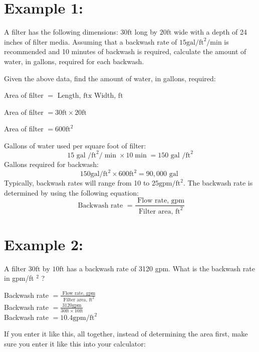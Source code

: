 \documentclass[10pt]{article}
\begin{document}
\section{Example 1:}
A filter has the following dimensions: $30 \mathrm{ft}$ long by $20 \mathrm{ft}$ wide with a depth of 24 inches of filter media. Assuming that a backwash rate of $15 \mathrm{gal} / \mathrm{ft}^{2} / \mathrm{min}$ is recommended and 10 minutes of backwash is required, calculate the amount of water, in gallons, required for each backwash.

Given the above data, find the amount of water, in gallons, required:

Area of filter $=$ Length, $\mathrm{ft} \mathrm{x}$ Width, $\mathrm{ft}$

Area of filter $=30 \mathrm{ft} \times 20 \mathrm{ft}$

Area of filter $=600 \mathrm{ft}^{2}$

Gallons of water used per square foot of filter:
$$
15 \text { gal } / \mathrm{ft}^{2} / \min \times 10 \min =150 \text { gal } / \mathrm{ft}^{2}
$$
Gallons required for backwash:
$$
150 \mathrm{gal} / \mathrm{ft}^{2} \times 600 \mathrm{ft}^{2}=90,000 \text { gal }
$$
Typically, backwash rates will range from 10 to $25 \mathrm{gpm} / \mathrm{ft}^{2}$. The backwash rate is determined by using the following equation:
$$
\text { Backwash rate }=\frac{\text { Flow rate, } \mathrm{gpm}}{\text { Filter area, } \mathrm{ft}^{2}}
$$

\section{Example 2:}
A filter $30 \mathrm{ft}$ by $10 \mathrm{ft}$ has a backwash rate of 3120 gpm. What is the backwash rate in gpm/ft ${ }^{2}$ ?

Backwash rate $=\frac{\text { Flow rate, } \mathrm{gpm}}{\text { Filter area, } \mathrm{ft}^{2}}$\\
Backwash rate $=\frac{3120 \mathrm{gpm}}{30 \mathrm{ft} \times 10 \mathrm{ft}}$\\
Backwash rate $=10.4 \mathrm{gpm} / \mathrm{ft}^{2}$

If you enter it like this, all together, instead of determining the area first, make sure you enter it like this into your calculator:
\end{document}
